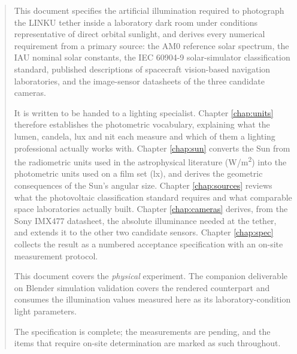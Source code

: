 \documentclass[a4paper, twoside]{report}
\begin{document}


\begin{abstract}
This document specifies the artificial illumination required to photograph the LINKU tether inside a laboratory dark room under conditions representative of direct orbital sunlight, and derives every numerical requirement from a primary source: the AM0 reference solar spectrum, the IAU nominal solar constants, the IEC 60904-9 solar-simulator classification standard, published descriptions of spacecraft vision-based navigation laboratories, and the image-sensor datasheets of the three candidate cameras.

It is written to be handed to a lighting specialist. Chapter \ref{chap:units} therefore establishes the photometric vocabulary, explaining what the lumen, candela, lux and nit each measure and which of them a lighting professional actually works with. Chapter \ref{chap:sun} converts the Sun from the radiometric units used in the astrophysical literature (W/m\textsuperscript{2}) into the photometric units used on a film set (lx), and derives the geometric consequences of the Sun's angular size. Chapter \ref{chap:sources} reviews what the photovoltaic classification standard requires and what comparable space laboratories actually built. Chapter \ref{chap:cameras} derives, from the Sony IMX477 datasheet, the absolute illuminance needed at the tether, and extends it to the other two candidate sensors. Chapter \ref{chap:spec} collects the result as a numbered acceptance specification with an on-site measurement protocol.

This document covers the \emph{physical} experiment. The companion deliverable on Blender simulation validation covers the rendered counterpart and consumes the illumination values measured here as its laboratory-condition light parameters.

The specification is complete; the measurements are pending, and the items that require on-site determination are marked as such throughout.
\end{abstract}

\tableofcontents
\listoffigures
\listoftables












\end{document}
